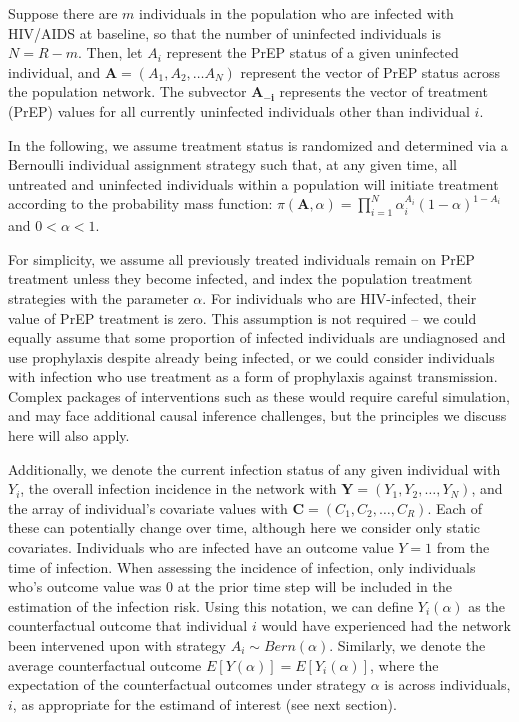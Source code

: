 \documentclass{article}
\theoremstyle{definition}
\begin{document}
Suppose there are $m$ individuals in the population who are infected with HIV/AIDS at baseline, so that the number of uninfected individuals is $N = R-m$. Then, let $A_{i}$ represent the PrEP status of a given uninfected individual, and $\mathbf{A} = (A_{1}, A_{2}, \ldots A_{N})$ represent the vector of PrEP status across the population network. The subvector $\mathbf{A_{-i}}$ represents the vector of treatment (PrEP) values for all currently uninfected individuals other than individual $i$.

In the following, we assume treatment status is randomized and determined via a Bernoulli individual assignment strategy such that, at any given time, all untreated and uninfected individuals within a population will initiate treatment according to the probability mass function: $\pi(\mathbf{A}, \alpha) = \prod_{i=1}^{N}{\alpha_{i}^{A_{i}}(1-\alpha)^{1-A_{i}}}$ and $0 < \alpha < 1$. 

For simplicity, we assume all previously treated individuals remain on PrEP treatment unless they become infected, and index the population treatment strategies with the parameter $\alpha$. For individuals who are HIV-infected, their value of PrEP treatment is zero. This assumption is not required -- we could equally assume that some proportion of infected individuals are undiagnosed and use prophylaxis despite already being infected, or we could consider individuals with infection who use treatment as a form of prophylaxis against transmission. Complex packages of interventions such as these would require careful simulation, and may face additional causal inference challenges, but the principles we discuss here will also apply.

Additionally, we denote the current infection status of any given individual with $Y_i$, the overall infection incidence in the network with $\mathbf{Y} = (Y_{1}, Y_{2}, \ldots, Y_{N})$, and the array of individual’s covariate values with  $\mathbf{C} = (C_{1}, C_{2}, \ldots, C_{R})$. Each of these can potentially change over time, although here we consider only static covariates. Individuals who are infected have an outcome value $Y=1$ from the time of infection. When assessing the incidence of infection, only individuals who's outcome value was 0 at the prior time step will be included in the estimation of the infection risk. Using this notation, we can define $Y_{i}(\alpha)$ as the counterfactual outcome that individual $i$ would have experienced had the network been intervened upon with strategy $A_i \sim Bern(\alpha)$. Similarly, we denote the average counterfactual outcome $E[Y(\alpha)] = E[Y_{i}(\alpha)]$, where the expectation of the counterfactual outcomes under strategy $\alpha$ is across individuals, $i$, as appropriate for the estimand of interest (see next section).
\end{document}
